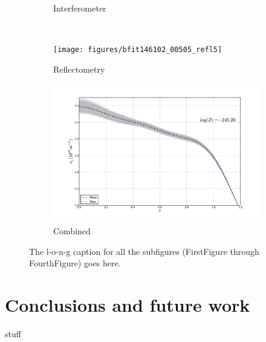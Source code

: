 \documentclass	[12pt]{article}
\begin{document}
\begin{figure}[h!]
\begin{subfigure}[b]{0.5\textwidth}
		\vspace{-30pt}
		\caption{Interferometer}
		\label{fig:inter505}
	\end{subfigure} \\%
	\begin{subfigure}[b]{0.5\textwidth}
		\centering
		\texttt{[image: figures/bfit146102\_00505\_refl5]}
		\vspace{-30pt}
		\caption{Reflectometry}
		\label{fig:refl505}
	\end{subfigure}
	\hspace{-20pt}
	\begin{subfigure}[b]{0.5\textwidth}
		\centering
		\includegraphics[width=\textwidth,keepaspectratio=true]{figures/bfit146102_00505_all5}
		\vspace{-30pt}
		\caption{Combined}
		\label{fig:all505}
	\end{subfigure}
	\caption{The l-o-n-g caption for all the subfigures (FirstFigure through FourthFigure) goes here.}
	\label{fig:dne505}
\end{figure}
\section{Conclusions and future work}
stuff



\end{document}
